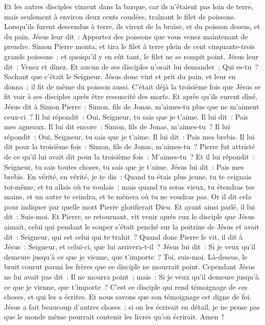 \begin{multicols}{2}
Et les autres disciples vinrent dans la barque, car ils n'étaient pas loin de terre, mais seulement à environ deux cents coudées, traînant le filet de poissons.
Lorsqu'ils furent descendus à terre, ils virent de la braise, et du poisson dessus, et du pain.
Jésus leur dit~: Apportez des poissons que vous venez maintenant de prendre.
Simon Pierre monta, et tira le filet à terre plein de cent cinquante-trois grands poissons~; et quoiqu'il y en eût tant, le filet ne se rompit point.
Jésus leur dit~: Venez et dînez. Et aucun de ses disciples n'osait lui demander~: Qui es-tu~? Sachant que c'était le Seigneur.
Jésus donc vint et prit du pain, et leur en donna~; il fit de même du poisson aussi.
C'était déjà la troisième fois que Jésus se fit voir à ses disciples après être ressuscité des morts.
Et après qu'ils eurent dîné, Jésus dit à Simon Pierre~: Simon, fils de Jonas, m'aimes-tu plus que ne m'aiment ceux-ci~? Il lui répondit~: Oui, Seigneur, tu sais que je t'aime. Il lui dit~: Pais mes agneaux.
Il lui dit encore~: Simon, fils de Jonas, m'aimes-tu~? Il lui répondit~: Oui, Seigneur, tu sais que je t'aime. Il lui dit~: Pais mes brebis.
Il lui dit pour la troisième fois~: Simon, fils de Jonas, m'aimes-tu~? Pierre fut attristé de ce qu'il lui avait dit pour la troisième fois~: M'aimes-tu~? Et il lui répondit~: Seigneur, tu sais toutes choses, tu sais que je t'aime. Jésus lui dit~: Pais mes brebis.
En vérité, en vérité, je te dis~: Quand tu étais plus jeune, tu te ceignais toi-même, et tu allais où tu voulais~; mais quand tu seras vieux, tu étendras tes mains, et un autre te ceindra, et te mènera où tu ne voudras pas.
Or il dit cela pour indiquer par quelle mort Pierre glorifierait Dieu. Et ayant ainsi parlé, il lui dit~: Suis-moi.
Et Pierre, se retournant, vit venir après eux le disciple que Jésus aimait, celui qui pendant le souper s'était penché sur la poitrine de Jésus et avait dit~: Seigneur, qui est celui qui te trahit~?
Quand donc Pierre le vit, il dit à Jésus~: Seigneur, et celui-ci, que lui arrivera-t-il~?
Jésus lui dit~: Si je veux qu'il demeure jusqu'à ce que je vienne, que t'importe~? Toi, suis-moi.
Là-dessus, le bruit courut parmi les frères que ce disciple ne mourrait point. Cependant Jésus ne lui avait pas dit~: Il ne mourra point~; mais~: Si je veux qu'il demeure jusqu'à ce que je vienne, que t'importe~?
C'est ce disciple qui rend témoignage de ces choses, et qui les a écrites. Et nous savons que son témoignage est digne de foi.
Jésus a fait beaucoup d'autres choses~; si on les écrivait en détail, je ne pense pas que le monde même pourrait contenir les livres qu'on écrirait. Amen~!
\PPE{}
\end{multicols}
